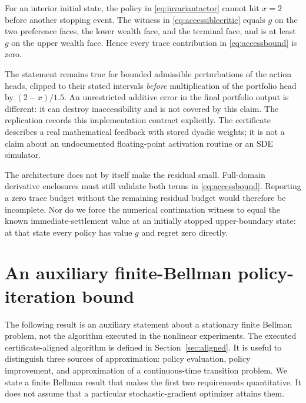 \begin{proposition}\label{prop:architecture}
For an interior initial state, the policy in \eqref{eq:invariantactor} cannot hit $x=2$ before another stopping event. The witness in \eqref{eq:accessiblecritic} equals $g$ on the two preference faces, the lower wealth face, and the terminal face, and is at least $g$ on the upper wealth face. Hence every trace contribution in \eqref{eq:accessbound} is zero.
\end{proposition}
The statement remains true for bounded admissible perturbations of the action heads, clipped to their stated intervals \emph{before} multiplication of the portfolio head by $(2-x)/1.5$. An unrestricted additive error in the final portfolio output is different: it can destroy inaccessibility and is not covered by this claim. The replication records this implementation contract explicitly. The certificate describes a real mathematical feedback with stored dyadic weights; it is not a claim about an undocumented floating-point activation routine or an SDE simulator.

The architecture does not by itself make the residual small. Full-domain derivative enclosures must still validate both terms in \eqref{eq:accessbound}. Reporting a zero trace budget without the remaining residual budget would therefore be incomplete. Nor do we force the numerical continuation witness to equal the known immediate-settlement value at an initially stopped upper-boundary state: at that state every policy has value $g$ and regret zero directly.

\section{An auxiliary finite-Bellman policy-iteration bound}\label{sec:certifiediteration}
The following result is an auxiliary statement about a stationary finite Bellman problem, not the algorithm executed in the nonlinear experiments. The executed certificate-aligned algorithm is defined in Section~\ref{sec:aligned}. It is useful to distinguish three sources of approximation: policy evaluation, policy improvement, and approximation of a continuous-time transition problem. We state a finite Bellman result that makes the first two requirements quantitative. It does not assume that a particular stochastic-gradient optimizer attains them.

